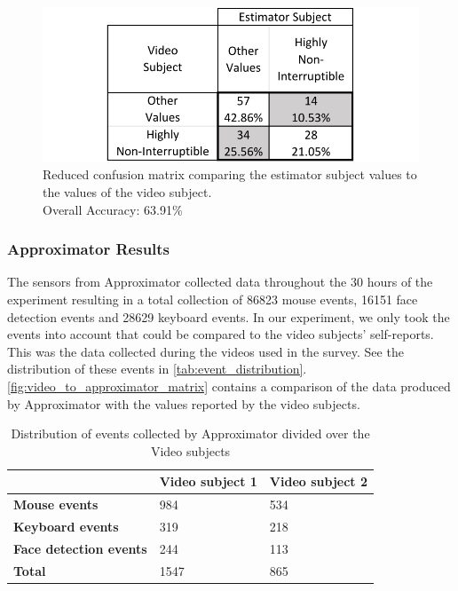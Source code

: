 \documentclass{sigchi}
\begin{document}
\begin{figure}[h]
  \centering
  \includegraphics[width=\columnwidth]{figures/VideoToEstimatorReducedConfusionMatrix.pdf}
  \caption{Reduced confusion matrix comparing the estimator subject values to the values of the video subject. \\Overall Accuracy: 63.91\%}
  \label{fig:reduced_video_to_estimator_matrix}
\end{figure}

\subsubsection{Approximator Results}
The sensors from Approximator collected data throughout the 30 hours of the experiment resulting in a total collection of 86823 mouse events, 16151 face detection events and 28629 keyboard events.
In our experiment, we only took the events into account that could be compared to the video subjects' self-reports.
This was the data collected during the videos used in the survey. See the distribution of these events in \autoref{tab:event_distribution}.
\autoref{fig:video_to_approximator_matrix} contains a comparison of the data produced by Approximator with the values reported by the video subjects.

\begin{table}[h]
  \centering
  \begin{tabular}{@{}lll@{}}
    \toprule
     & \textbf{Video subject 1} & \textbf{Video subject 2}\\ \midrule
    \textbf{Mouse events}       & 984    & 534    \\
    \textbf{Keyboard events}       & 319    & 218    \\
    \textbf{Face detection events}       & 244    & 113    \\ \midrule
    \textbf{Total}   & 1547 & 865\\ \bottomrule
  \end{tabular}
  \caption{Distribution of events collected by Approximator divided over the Video subjects}
  \label{tab:event_distribution}
\end{table}
\end{document}
